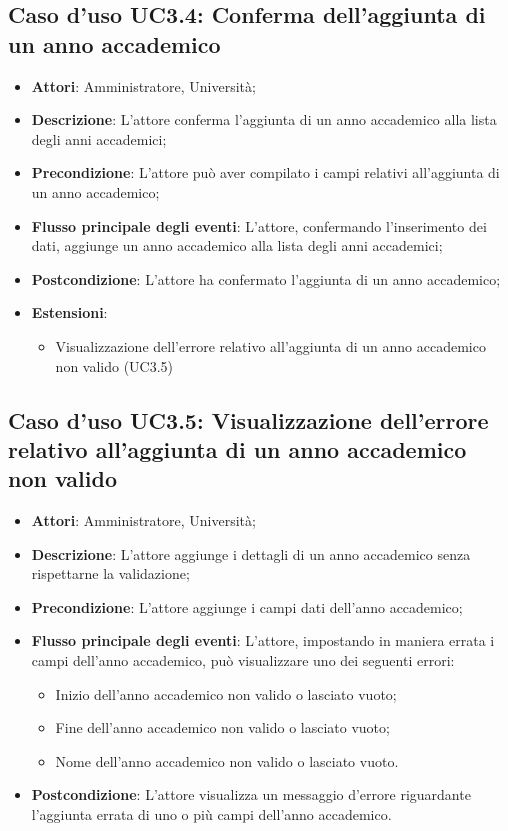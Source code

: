\subsection{Caso d'uso \texorpdfstring{UC3.4}{UC3.4}: Conferma dell'aggiunta di un anno accademico}
\begin{itemize}
\item \textbf{Attori}: Amministratore, Università;
\item \textbf{Descrizione}: L'attore conferma l'aggiunta di un anno accademico alla lista degli anni accademici;
\item \textbf{Precondizione}: L'attore può aver compilato i campi relativi all'aggiunta di un anno accademico;
\item \textbf{Flusso principale degli eventi}: L'attore, confermando l'inserimento dei dati, aggiunge un anno accademico alla lista degli anni accademici;
\item \textbf{Postcondizione}: L'attore ha confermato l'aggiunta di un anno accademico;
\item \textbf{Estensioni}:
\begin{itemize}
\item Visualizzazione dell'errore relativo all'aggiunta di un anno accademico non valido (UC3.5)
\end{itemize}
\end{itemize}
\subsection{Caso d'uso \texorpdfstring{UC3.5}{UC3.5}: Visualizzazione dell'errore relativo all'aggiunta di un anno accademico non valido}
\begin{itemize}
\item \textbf{Attori}: Amministratore, Università;
\item \textbf{Descrizione}: L'attore aggiunge i dettagli di un anno accademico senza rispettarne la validazione;
\item \textbf{Precondizione}: L'attore aggiunge i campi dati dell'anno accademico;
\item \textbf{Flusso principale degli eventi}: L'attore, impostando in maniera errata i campi dell'anno accademico, può visualizzare uno dei seguenti errori:
\begin{itemize}
\item Inizio dell'anno accademico non valido o lasciato vuoto;
\item Fine dell'anno accademico non valido o lasciato vuoto;
\item Nome dell'anno accademico non valido o lasciato vuoto.
\end{itemize}
\item \textbf{Postcondizione}: L'attore visualizza un messaggio d'errore riguardante l'aggiunta errata di uno o più campi dell'anno accademico.
\end{itemize}

